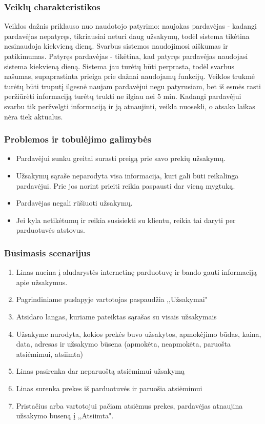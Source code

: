 \documentclass[oneside]{VUMIFPSkursinis}
\begin{document}
		\subsubsection{Veiklų charakteristikos}
			Veiklos dažnis priklauso nuo naudotojo patyrimo: naujokas pardavėjas - kadangi pardavėjas nepatyręs, tikriausiai neturi daug užsakymų, todėl sistema tikėtina nesinaudoja kiekvieną dieną. Svarbus sistemos naudojimosi aiškumas ir patikimumas. Patyręs pardavėjas - tikėtina, kad patyręs pardavėjas naudojasi sistema kiekvieną dieną. Sistema jau turėtų būti perprasta, todėl svarbus našumas, supaprastinta prieiga prie dažnai naudojamų funkcijų.
			Veiklos trukmė turėtų būti truputį ilgesnė naujam pardavėjui negu patyrusiam, bet iš esmės rasti peržiūrėti informaciją turėtų trukti ne ilgiau nei 5 min.
			Kadangi pardavėjui svarbu tik peržvelgti informaciją ir ją atnaujinti, veikla nuosekli, o atsako laikas nėra tiek aktualus.

		\subsubsection{Problemos ir tobulėjimo galimybės}
			\begin{itemize}
				\item{Pardavėjui sunku greitai surasti preigą prie savo prekių užsakymų.}
				\item{Užsakymų sąraše neparodyta visa informacija, kuri gali būti reikalinga pardavėjui. Prie jos norint prieiti reikia paspausti dar vieną mygtuką.}
				\item{Pardavėjas negali rūšiuoti užsakymų.}
				\item{Jei kyla netikėtumų ir reikia susisiekti su klientu, reikia tai daryti per parduotuvės atstovus.}
			\end{itemize}

		\subsubsection{Būsimasis scenarijus}
			\begin{enumerate}
				\item{Linas nueina į aludarystės internetinę parduotuvę ir bando gauti informaciją apie užsakymus.}
				\item{Pagrindiniame puslapyje vartotojas paspaudžia ,,Užsakymai"}
				\item{Atsidaro langas, kuriame pateiktas sąrašas su visais užsakymais}
				\item{Užsakyme nurodyta, kokios prekės buvo užsakytos, apmokėjimo būdas, kaina, data, adresas ir užsakymo būsena (apmokėta, neapmokėta, paruošta atsiėmimui, atsiimta)}
				\item{Linas pasirenka dar neparuoštą atsiėmimui užsakymą}
				\item{Linas surenka prekes iš parduotuvės ir paruošia atsiėmimui}
				\item{Pristačius arba vartotojui pačiam atsiėmus prekes, pardavėjas atnaujina užsakymo būseną į ,,Atsiimta".}
				\end{enumerate}
\end{document}
